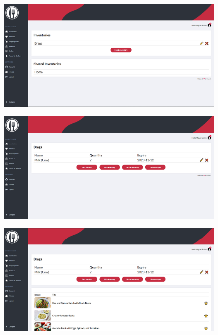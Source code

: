 \documentclass[a4paper]{report}
\begin{document}
    \begin{figure}[H]
        \centering
            \includegraphics[width=\textwidth]{images/produto_final/inicial.png}
    \end{figure}

    \begin{figure}[H]
        \centering
            \includegraphics[width=\textwidth]{images/produto_final/iventario.png}
    \end{figure}

    \begin{figure}[H]
        \centering
            \includegraphics[width=\textwidth]{images/produto_final/iventario_receitas.png}
    \end{figure}
\end{document}
